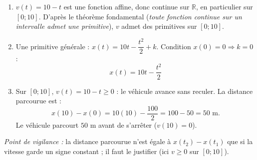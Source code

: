 \documentclass[11pt]{article}
\begin{document}
\begin{corrige}
\begin{enumerate}
    \item $v(t)=10-t$ est une fonction affine, donc continue sur $\mathbb{R}$, en particulier sur $[0;10]$. D'après le théorème fondamental (\emph{toute fonction continue sur un intervalle admet une primitive}), $v$ admet des primitives sur $[0;10]$.
    \item Une primitive générale : $x(t)=10t-\dfrac{t^2}{2}+k$. Condition $x(0)=0 \Rightarrow k=0$ :
    \[ \boxed{x(t)=10t-\frac{t^2}{2}} \]
    \item Sur $[0;10]$, $v(t)=10-t\ge 0$ : le véhicule avance sans reculer. La distance parcourue est :
    \[ x(10)-x(0) = 10(10)-\frac{100}{2} = 100-50 = 50 \text{ m}. \]
    Le véhicule parcourt $50$ m avant de s'arrêter ($v(10)=0$).
\end{enumerate}
\emph{Point de vigilance :} la distance parcourue n'est égale à $x(t_2)-x(t_1)$ que si la vitesse garde un signe constant ; il faut le justifier (ici $v\ge 0$ sur $[0;10]$).
\end{corrige}
\end{document}
